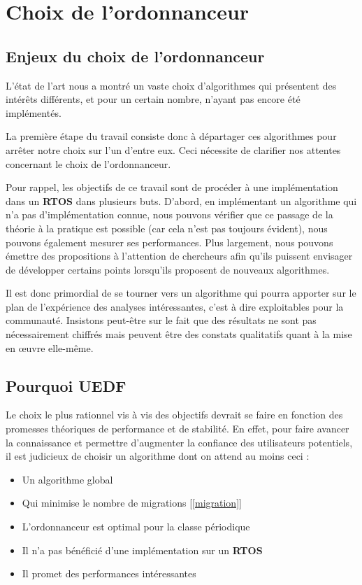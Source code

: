 	\section{Choix de l'ordonnanceur}
	

	\subsection{Enjeux du choix de l'ordonnanceur}
	
	L'état de l'art nous a montré un vaste choix d'algorithmes qui présentent 
	des intérêts différents, et pour un certain nombre, 
	n'ayant pas encore été implémentés. \newline
	
	La première étape du travail consiste donc à départager ces algorithmes pour arrêter notre choix sur l'un d'entre eux. Ceci nécessite de clarifier nos attentes concernant le choix de l'ordonnanceur.\newline
	
	Pour rappel, les objectifs de ce travail sont de procéder à une implémentation dans 
	un \textbf{RTOS} dans plusieurs buts. 
	D'abord, en implémentant un algorithme qui n'a pas d'implémentation connue, nous 
	pouvons vérifier que ce passage de la théorie à la pratique est possible (car cela n'est pas 
	toujours évident), nous pouvons également mesurer ses performances. 
	Plus largement, nous pouvons émettre des propositions à l'attention de chercheurs 
	afin qu'ils puissent envisager de développer certains points lorsqu'ils proposent de nouveaux algorithmes. \newline
	
	Il est donc primordial de se tourner vers un algorithme qui pourra apporter sur le plan de 
	l'expérience des analyses intéressantes, c'est à dire exploitables pour la communauté. 
	Insistons peut-être sur le fait que des résultats ne sont pas nécessairement chiffrés mais 
	peuvent être des constats qualitatifs quant à la mise en œuvre elle-même.\newline
	
	\subsection{Pourquoi UEDF}
	
	Le choix le plus rationnel vis à vis des objectifs devrait se faire en fonction des 
	promesses théoriques de performance et de stabilité. 
	En effet, pour faire avancer la connaissance et permettre d'augmenter la confiance des utilisateurs 
	potentiels, il est judicieux de choisir un algorithme dont on attend au moins ceci :
	\begin{itemize}
		\setlength\itemsep{0.1em}
		\item Un algorithme global
		\item Qui minimise le nombre de migrations [\ref*{migration}]
		\item L'ordonnanceur est optimal pour la classe périodique
		\item Il n'a pas bénéficié d'une implémentation sur un \textbf{RTOS}
		\item Il promet des performances intéressantes
	\end{itemize}
	

